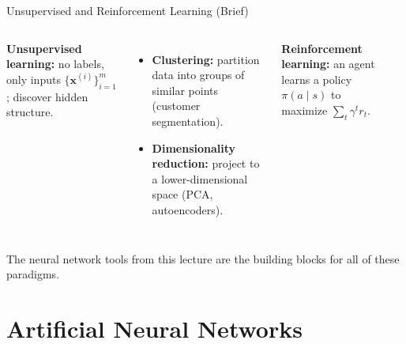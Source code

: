 \documentclass[aspectratio=169,11pt]{beamer}
\newcommand{\x}{\bm{x}}
\begin{document}
\begin{frame}{Unsupervised and Reinforcement Learning (Brief)}
\begin{columns}[T]
\textbf{Unsupervised learning:} no labels, only inputs $\{\x^{(i)}\}_{i=1}^{m}$; discover hidden structure.
\begin{itemize}
    \item \textbf{Clustering:} partition data into groups of similar points (customer segmentation).
    \item \textbf{Dimensionality reduction:} project to a lower-dimensional space (PCA, autoencoders).
\end{itemize}

\textbf{Reinforcement learning:} an agent learns a policy $\pi(a\mid s)$ to maximize $\sum_{t}\gamma^t r_t$.

\vspace{0.2cm}
\begin{center}
\end{center}
\end{columns}

\vspace{0.5cm}
{\small The neural network tools from this lecture are the building blocks for all of these paradigms.}
\end{frame}


\section{Artificial Neural Networks}
\end{document}
